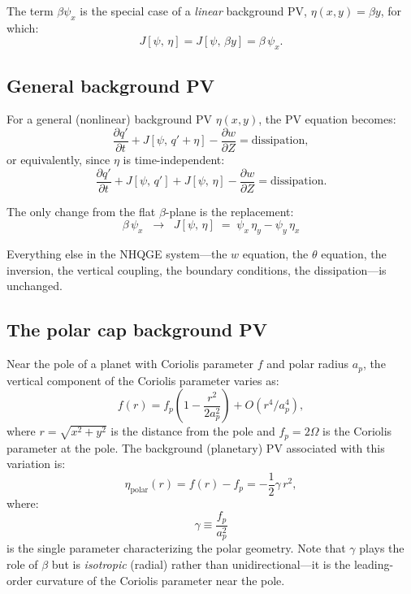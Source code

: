 \documentclass[11pt]{article}
\newcommand{\pderiv}[2]{\frac{\partial #1}{\partial #2}}
\newcommand{\Jac}[2]{J\!\left[#1,\,#2\right]}
\begin{document}
The term $\beta\psi_x$ is the special case of a \emph{linear} background PV, $\eta(x,y) = \beta y$, for which:
\begin{equation}
\Jac{\psi}{\eta} = \Jac{\psi}{\beta y} = \beta\,\psi_x.
\end{equation}

\subsection{General background PV}

For a general (nonlinear) background PV $\eta(x,y)$, the PV equation becomes:
\begin{equation}
\pderiv{q'}{t} + \Jac{\psi}{q' + \eta} - \pderiv{w}{Z} = \text{dissipation},
\label{eq:general_pv}
\end{equation}
or equivalently, since $\eta$ is time-independent:
\begin{equation}
\pderiv{q'}{t} + \Jac{\psi}{q'} + \Jac{\psi}{\eta} - \pderiv{w}{Z} = \text{dissipation}.
\label{eq:general_pv2}
\end{equation}

The only change from the flat $\beta$-plane is the replacement:
\begin{equation}
\boxed{\beta\,\psi_x \;\;\longrightarrow\;\; \Jac{\psi}{\eta} \;=\; \psi_x\,\eta_y - \psi_y\,\eta_x}
\label{eq:replacement}
\end{equation}

Everything else in the NHQGE system---the $w$ equation, the $\theta$ equation, the inversion, the vertical coupling, the boundary conditions, the dissipation---is unchanged.

\subsection{The polar cap background PV}

Near the pole of a planet with Coriolis parameter $f$ and polar radius $a_p$, the vertical component of the Coriolis parameter varies as:
\begin{equation}
f(r) = f_p\!\left(1 - \frac{r^2}{2a_p^2}\right) + O(r^4/a_p^4),
\end{equation}
where $r = \sqrt{x^2 + y^2}$ is the distance from the pole and $f_p = 2\Omega$ is the Coriolis parameter at the pole. The background (planetary) PV associated with this variation is:
\begin{equation}
\eta_{\mathrm{polar}}(r) = f(r) - f_p = -\frac{1}{2}\gamma\,r^2,
\label{eq:eta_polar}
\end{equation}
where:
\begin{equation}
\boxed{\gamma \equiv \frac{f_p}{a_p^2}}
\label{eq:gamma_def}
\end{equation}
is the single parameter characterizing the polar geometry. Note that $\gamma$ plays the role of $\beta$ but is \emph{isotropic} (radial) rather than unidirectional---it is the leading-order curvature of the Coriolis parameter near the pole.
\end{document}

